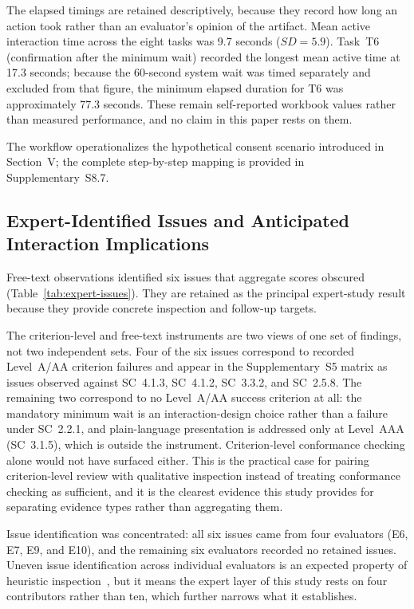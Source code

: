\documentclass[journal]{IEEEtran}
\begin{document}
The elapsed timings are retained descriptively, because they record how long an action took rather than an evaluator's opinion of the artifact. Mean active interaction time across the eight tasks was 9.7 seconds ($SD=5.9$). Task~T6 (confirmation after the minimum wait) recorded the longest mean active time at 17.3 seconds; because the 60-second system wait was timed separately and excluded from that figure, the minimum elapsed duration for T6 was approximately 77.3 seconds. These remain self-reported workbook values rather than measured performance, and no claim in this paper rests on them.

The workflow operationalizes the hypothetical consent scenario introduced in Section~V; the complete step-by-step mapping is provided in Supplementary~S8.7.

\subsection{Expert-Identified Issues and Anticipated Interaction Implications}
\label{subsec:expert-issues}

Free-text observations identified six issues that aggregate scores obscured (Table~\ref{tab:expert-issues}). They are retained as the principal expert-study result because they provide concrete inspection and follow-up targets.

The criterion-level and free-text instruments are two views of one set of findings, not two independent sets. Four of the six issues correspond to recorded Level~A/AA criterion failures and appear in the Supplementary~S5 matrix as issues observed against SC~4.1.3, SC~4.1.2, SC~3.3.2, and SC~2.5.8. The remaining two correspond to no Level~A/AA success criterion at all: the mandatory minimum wait is an interaction-design choice rather than a failure under SC~2.2.1, and plain-language presentation is addressed only at Level~AAA (SC~3.1.5), which is outside the instrument. Criterion-level conformance checking alone would not have surfaced either. This is the practical case for pairing criterion-level review with qualitative inspection instead of treating conformance checking as sufficient, and it is the clearest evidence this study provides for separating evidence types rather than aggregating them.

Issue identification was concentrated: all six issues came from four evaluators (E6, E7, E9, and E10), and the remaining six evaluators recorded no retained issues. Uneven issue identification across individual evaluators is an expected property of heuristic inspection~\cite{nielsen1992finding}, but it means the expert layer of this study rests on four contributors rather than ten, which further narrows what it establishes.
\end{document}
